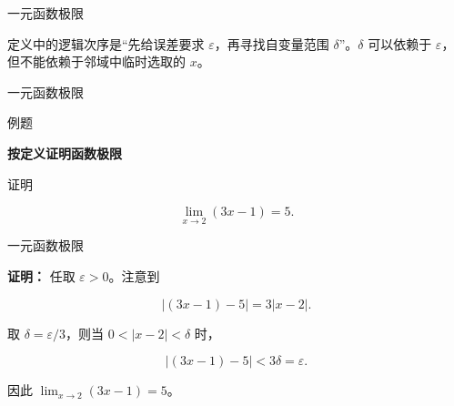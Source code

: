 \documentclass[aspectratio=169,10pt,fontset=fandol]{ctexbeamer}
\newenvironment{custom}[1]{\par\noindent\textbf{#1}\quad}{\par\vspace{0.8em}}
\begin{document}
\begin{frame}[t,fragile]{一元函数极限}
\normalsize
{\normalsize
定义中的逻辑次序是“先给误差要求 \(\varepsilon\)，再寻找自变量范围 \(\delta\)”。\(\delta\) 可以依赖于 \(\varepsilon\)，但不能依赖于邻域中临时选取的 \(x\)。




}
\end{frame}
\begin{frame}[t,fragile]{一元函数极限}
\normalsize
\begin{block}{例题}
{\normalsize
\textbf{按定义证明函数极限}\par


证明

\[

\lim_{x\to2}(3x-1)=5.

\]


}
\end{block}
\end{frame}
\begin{frame}[t,fragile]{一元函数极限}
\normalsize
{\normalsize
\textbf{证明：}
任取 \(\varepsilon>0\)。注意到

\[

|(3x-1)-5|=3|x-2|.

\]

取 \(\delta=\varepsilon/3\)，则当 \(0<|x-2|<\delta\) 时，

\[

|(3x-1)-5|<3\delta=\varepsilon.

\]

因此 \(\lim_{x\to2}(3x-1)=5\)。


}
\end{frame}
\end{document}
